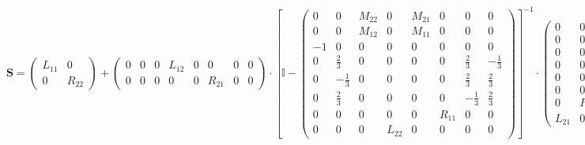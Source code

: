 \[ \mathbf{S} = \left(\begin{smallmatrix} L_{11} & 0 \\ 0 & R_{22}
\end{smallmatrix}\right) + \left(\begin{smallmatrix} 0 & 0 & 0 &
L_{12} & 0 & 0 & 0 & 0 \\ 0 & 0 & 0 & 0 & 0 & R_{21} & 0 & 0
\end{smallmatrix}\right) \cdot \left[ \mathbb{I}  -
\left(\begin{smallmatrix} 0 & 0 & M_{22} & 0 & M_{21} & 0 & 0 & 0 \\ 0
& 0 & M_{12} & 0 & M_{11} & 0 & 0 & 0 \\ -1 & 0 & 0 & 0 & 0 & 0 & 0 &
0 \\ 0 & \frac{2}{3} & 0 & 0 & 0 & 0 & \frac{2}{3} & -\frac{1}{3} \\ 0
& -\frac{1}{3} & 0 & 0 & 0 & 0 & \frac{2}{3} & \frac{2}{3} \\ 0 &
\frac{2}{3} & 0 & 0 & 0 & 0 & -\frac{1}{3} & \frac{2}{3} \\ 0 & 0 & 0
& 0 & 0 & R_{11} & 0 & 0 \\ 0 & 0 & 0 & L_{22} & 0 & 0 & 0 & 0
\end{smallmatrix}\right) \right]^{-1} \cdot\left(\begin{smallmatrix} 0
& 0 \\ 0 & 0 \\ 0 & 0 \\ 0 & 0 \\ 0 & 0 \\ 0 & 0 \\ 0 & R_{12} \\
L_{21} & 0 \end{smallmatrix}\right) \]
